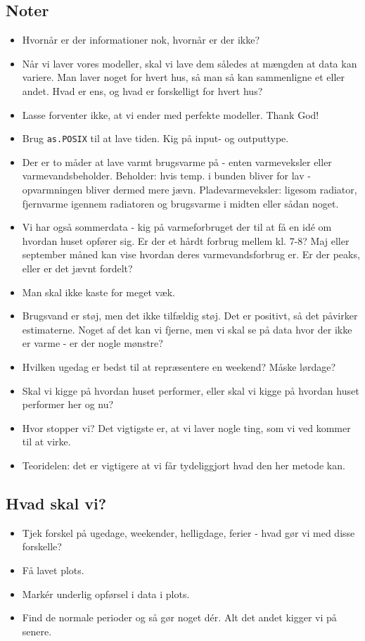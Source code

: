 \subsection{Noter}
\begin{itemize}
    \item Hvornår er der informationer nok, hvornår er der ikke?
    \item Når vi laver vores modeller, skal vi lave dem således at mængden at data kan variere. Man laver noget for hvert hus, så man så kan sammenligne et eller andet. Hvad er ens, og hvad er forskelligt for hvert hus? 
    \item Lasse forventer ikke, at vi ender med perfekte modeller. Thank God! 
    \item Brug \texttt{as.POSIX} til at lave tiden. Kig på input- og outputtype. 
    \item Der er to måder at lave varmt brugsvarme på - enten varmeveksler eller varmevandsbeholder. Beholder: hvis temp. i bunden bliver for lav - opvarmningen bliver dermed mere jævn. Pladevarmeveksler: ligesom radiator, fjernvarme igennem radiatoren og brugsvarme i midten eller sådan noget. 
    \item Vi har også sommerdata - kig på varmeforbruget der til at få en idé om hvordan huset opfører sig. Er der et hårdt forbrug mellem kl. 7-8? Maj eller september måned kan vise hvordan deres varmevandsforbrug er. Er der peaks, eller er det jævnt fordelt? 
    \item Man skal ikke kaste for meget væk.
    \item Brugsvand er støj, men det ikke tilfældig støj. Det er positivt, så det påvirker estimaterne. Noget af det kan vi fjerne, men vi skal se på data hvor der ikke er varme - er der nogle mønstre? 
    \item Hvilken ugedag er bedst til at repræsentere en weekend? Måske lørdage? 
    \item Skal vi kigge på hvordan huset performer, eller skal vi kigge på hvordan huset performer her og nu? 
    \item Hvor stopper vi? Det vigtigste er, at vi laver nogle ting, som vi ved kommer til at virke.
    \item Teoridelen: det er vigtigere at vi får tydeliggjort hvad den her metode kan.  
\end{itemize}

\subsection{Hvad skal vi?}
\begin{itemize}
    \item Tjek forskel på ugedage, weekender, helligdage, ferier - hvad gør vi med disse forskelle? 
    \item Få lavet plots. 
    \item Markér underlig opførsel i data i plots.
    \item Find de normale perioder og så gør noget dér. Alt det andet kigger vi på senere. 
\end{itemize}

